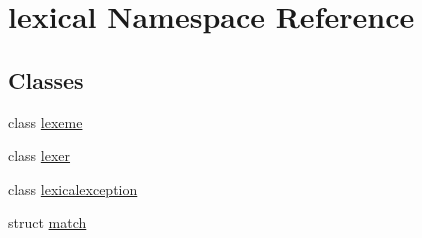 \hypertarget{namespacelexical}{}\section{lexical Namespace Reference}
\label{namespacelexical}
\subsection*{Classes}
\begin{DoxyCompactItemize}
\item 
class \hyperlink{classlexical_1_1lexeme}{lexeme}
\item 
class \hyperlink{classlexical_1_1lexer}{lexer}
\item 
class \hyperlink{classlexical_1_1lexicalexception}{lexicalexception}
\item 
struct \hyperlink{structlexical_1_1match}{match}
\end{DoxyCompactItemize}
